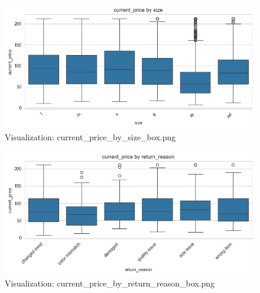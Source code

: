 \documentclass{article}%
\begin{document}
\begin{minipage}[c]{0.48\textwidth}%


\begin{figure}[H]%
\centering%
\includegraphics[width=\linewidth]{output/plots/current_price_by_size_box.png}%
\caption{Visualization: current\_price\_by\_size\_box.png}%
\end{figure}

%
\end{minipage}%
\begin{minipage}[c]{0.48\textwidth}%


\begin{figure}[H]%
\centering%
\includegraphics[width=\linewidth]{output/plots/current_price_by_return_reason_box.png}%
\caption{Visualization: current\_price\_by\_return\_reason\_box.png}%
\end{figure}

%
\end{minipage}%
\vspace{10pt}%
\\%
\end{document}
